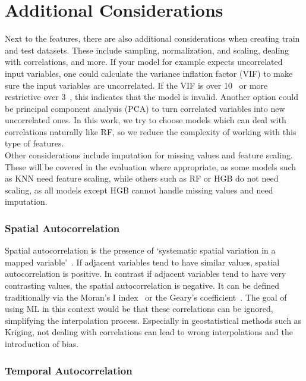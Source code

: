 \section{Additional Considerations}
\label{sec: additional considerations}

Next to the features, there are also additional considerations when creating train and test datasets. These include sampling, normalization, and scaling, dealing with correlations, and more. If your model for example expects uncorrelated input variables, one could calculate the variance inflation factor (VIF) to make sure the input variables are uncorrelated. If the VIF is over 10~\cite{montgomery2021introduction} or more restrictive over 3~\cite{zuur2010protocol}, this indicates that the model is invalid. Another option could be principal component analysis (PCA) to turn correlated variables into new uncorrelated ones. In this work, we try to choose models which can deal with correlations naturally like RF, so we reduce the complexity of working with this type of features.\\
Other considerations include imputation for missing values and feature scaling. These will be covered in the evaluation where appropriate, as some models such as KNN need feature scaling, while others such as RF or HGB do not need scaling, as all models except HGB cannot handle missing values and need imputation.

\subsubsection{Spatial Autocorrelation}

Spatial autocorrelation is the presence of `systematic spatial variation in a mapped variable'~\cite{haining2001spatial}. If adjacent variables tend to have similar values, spatial autocorrelation is positive. In contrast if adjacent variables tend to have very contrasting values, the spatial autocorrelation is negative. It can be defined traditionally via the Moran's I index~\cite{moran1948interpretation} or the Geary's coefficient~\cite{geary1954contiguity}. The goal of using ML in this context would be that these correlations can be ignored, simplifying the interpolation process. Especially in geostatistical methods such as Kriging, not dealing with correlations can lead to wrong interpolations and the introduction of bias.\\

\subsubsection{Temporal Autocorrelation}

